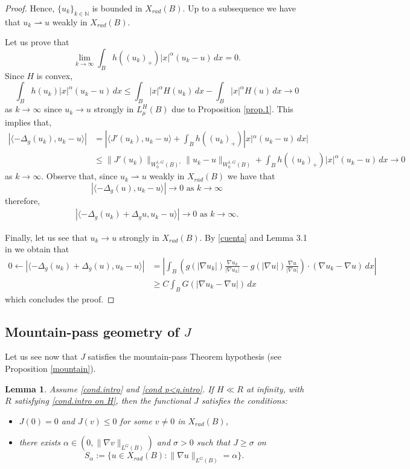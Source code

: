 \documentclass[leqno,twoside, 12pt]{amsart}
\theoremstyle{plain}
\numberwithin{equation}{section} \numberwithin{figure}{section}
\newtheorem{lemma}[theorem]{Lemma}
\theoremstyle{definition}
\numberwithin{equation}{section}
\newcommand{\N}{\mathbb{N}}
\newcommand{\cd}{\rightharpoonup}
\begin{document}
\begin{proof}
Hence, $\{u_k\}_{k\in\N}$ is bounded in $X_{rad}(B)$. Up to a subsequence we have that $u_k \cd u$ weakly in $X_{rad}(B)$.

Let us prove that
$$
\lim_{k\to\infty} \int_B  h( (u_k)_+)|x|^\alpha(u_k-u)\,dx=0.
$$
Since  $H$ is convex, 
$$
\int_B h( u_k)|x|^\alpha (u_k-u)\,dx \leq \int_B |x|^\alpha H( u_k)\,dx -\int_B |x|^\alpha H( u)\,dx \to 0 
$$
as $k\to\infty$ since $u_k \to  u$ strongly in $L_{\mu}^H(B)$ due to Proposition \ref{prop.1}. This implies that, 
\begin{align*}
|\langle -\Delta_g (u_k), u_k-u\rangle| &= |\langle J'(u_k), u_k-u\rangle + \int_B h( (u_k)_+)|x|^\alpha(u_k-u)\,dx |\\
&\leq
\|J'(u_k)\|_{W^{1,G}_0(B)'} \|u_k-u\|_{W^{1,G}_0(B)} + \int_B h( (u_k)_+)|x|^\alpha(u_k-u)\,dx \to 0
\end{align*}
as $k\to\infty$. Observe that, since $u_k\cd u$ weakly in $X_{rad}(B)$ we have that
$$
|\langle -\Delta_g (u), u_k-u\rangle| \to 0 \text{ as } k\to\infty
$$
therefore, 
\begin{align} \label{cuenta}
|\langle -\Delta_g (u_k) +\Delta_g u , u_k-u\rangle| \to 0 \text{ as } k\to\infty.
\end{align}

Finally, let us see that $u_k\to u$ strongly in $X_{rad}(B)$. By \eqref{cuenta} and  Lemma 3.1 in \cite{CSS} we obtain that
\begin{align*}
0\gets |\langle -\Delta_g (u_k) +\Delta_g (u), u_k-u\rangle| &= \left|  \int_B \left(g(|\nabla u_k|)\frac{\nabla u_k}{|\nabla u_k|} - g(|\nabla u|)\frac{\nabla u}{|\nabla u|}  \right)\cdot (\nabla u_k - \nabla u) \,dx \right|\\
&\geq C\int_B G(|\nabla u_k-\nabla u|)\,dx
\end{align*}
which concludes the proof.
\end{proof}


\subsection{Mountain-pass geometry of $J$}
Let us see now that $J$ satisfies the mountain-pass Theorem hypothesis (see Proposition \ref{mountain}).

\begin{lemma} \label{lema.2}Assume \eqref{cond.intro} and \eqref{cond p<q.intro}. If $H\ll R$ at infinity, with $R$ satisfying \eqref{cond.intro on H}, then the functional  $J$ satisfies the conditions:
\begin{itemize}
\item[(i)] $J(0)=0$ and $J(v)\leq 0$ for some $v\neq 0$ in $X_{rad}(B)$,
\item[(ii)] there exists $\alpha \in (0,\|\nabla v\|_{L^G(B)})$ and $\sigma>0$ such that $J\geq \sigma$ on
$$
S_\alpha :=\{u\in X_{rad}(B) \colon \|\nabla u\|_{L^G(B)} = \alpha\}.
$$
\end{itemize}
\end{lemma}
\end{document}
